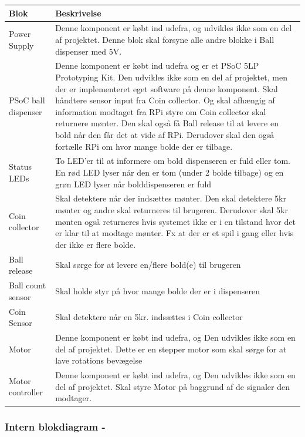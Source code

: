 \documentclass[Arkitektur/System_main.tex]{subfiles}
\begin{document}
\begin{table}[H]
\centering
\begin{tabular}{|L{0.2\columnwidth}|L{0.7\columnwidth}|}
\hline
\textbf{Blok} & \textbf{Beskrivelse} \\ \hline
Power Supply & Denne komponent er købt ind udefra, og udvikles ikke som en del af projektet. Denne blok skal forsyne alle andre blokke i Ball dispenser med 5V.\\ \hline
PSoC ball dispenser & Denne komponent er købt ind udefra og er et  PSoC 5LP Prototyping Kit\autocite{psoc5lp}. Den udvikles ikke som en del af projektet, men der er implementeret eget software på denne komponent. Skal håndtere sensor input fra Coin collector. Og skal afhængig af information modtaget fra RPi styre om Coin collector skal returnere mønter. Den skal også få Ball release til at levere en bold når den får det at vide af RPi. Derudover skal den også fortælle RPi om hvor mange bolde der er tilbage. \\ \hline
Status LEDs & To LED'er til at informere om bold dispenseren er fuld eller tom. En rød LED lyser når den er tom (under 2 bolde tilbage) og en grøn LED lyser når bolddispenseren er fuld\\ \hline
Coin collector & Skal detektere når der indsættes mønter. Den skal detektere 5kr mønter og andre skal returneres til brugeren. Derudover skal 5kr mønten også returneres hvis systemet ikke er i en tilstand hvor det er klar til at modtage mønter. Fx at der er et spil i gang eller hvis der ikke er flere bolde.\\ \hline
Ball release & Skal sørge for at levere en/flere bold(e) til brugeren\\ \hline
Ball count sensor & Skal holde styr på hvor mange bolde der er i dispenseren\\ \hline
Coin Sensor & Skal detektere når en 5kr. indsættes i Coin collector\\ \hline
Motor & Denne komponent er købt ind udefra, og Den udvikles ikke som en del af projektet. Dette er en stepper motor som skal sørge for at lave rotations bevægelse \\ \hline
Motor controller & Denne komponent er købt ind udefra, og Den udvikles ikke som en del af projektet. Skal styre Motor på baggrund af de signaler den modtager.\\ \hline
\end{tabular}
\end{table}

\subsubsection{Intern blokdiagram - } \label{sec:balldispenser_hardware_ibd}
\end{document}
